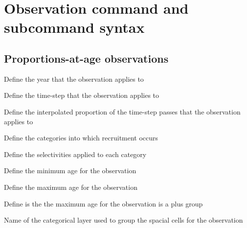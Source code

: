 \section{Observation command and subcommand syntax\label{sec:observation-syntax}}

\subsection{Proportions-at-age observations}


 {Define the year that the observation applies to}

 {Define the time-step that the observation applies to}

 {Define the interpolated proportion of the time-step passes that the observation applies to}

 {Define the categories into which recruitment occurs}

 {Define the selectivities applied to each category}

 {Define the minimum age for the observation}

 {Define the maximum age for the observation}

 {Define is the the maximum age for the observation is a plus group}

 {Name of the categorical layer used to group the spacial cells for the observation}

